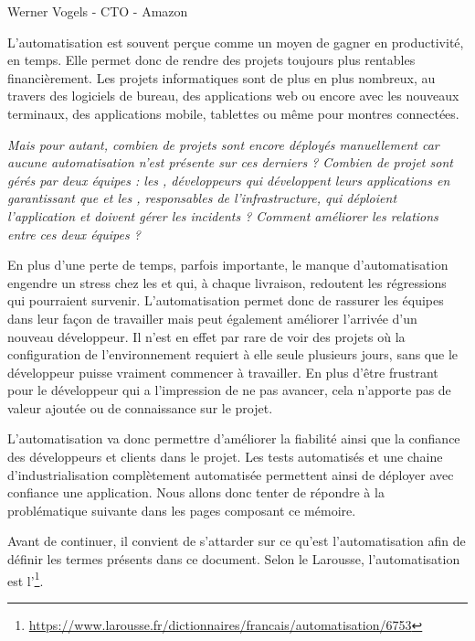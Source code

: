 \epigraph{}{Werner Vogels - \gls{CTO} - Amazon}

L'automatisation est souvent perçue comme un moyen de gagner en productivité, en temps. Elle permet donc de rendre des projets toujours plus rentables financièrement. Les projets informatiques sont de plus en plus nombreux, au travers des logiciels de bureau, des applications web ou encore avec les nouveaux terminaux, des applications mobile, tablettes ou même pour montres connectées.
	
\emph{Mais pour autant, combien de projets sont encore déployés manuellement car aucune automatisation n'est présente sur ces derniers ? Combien de projet sont gérés par deux équipes : les \frquote{\dev}, développeurs qui développent leurs applications en garantissant que  et les \frquote{\ops}, responsables de l'infrastructure, qui déploient l'application et doivent gérer les incidents ? Comment améliorer les relations entre ces deux équipes ?}
	
En plus d'une perte de temps, parfois importante, le manque d'automatisation engendre un stress chez les \dev{} et \ops{} qui, à chaque livraison, redoutent les régressions qui pourraient survenir. L'automatisation permet donc de rassurer les équipes dans leur façon de travailler mais peut également améliorer l'arrivée d'un nouveau développeur. Il n'est en effet par rare de voir des projets où la configuration de l'environnement requiert à elle seule plusieurs jours, sans que le développeur puisse vraiment commencer à travailler. En plus d'être frustrant pour le développeur qui a l'impression de ne pas avancer, cela n'apporte pas de valeur ajoutée ou de connaissance sur le projet.

L'automatisation va donc permettre d'améliorer la fiabilité ainsi que la confiance des développeurs et clients dans le projet. Les tests automatisés et une chaine d'industrialisation complètement automatisée permettent ainsi de déployer avec confiance une application. Nous allons donc tenter de répondre à la problématique suivante dans les pages composant ce mémoire.

\hrulefill

{\large \problematique}

\hrulefill

Avant de continuer, il convient de s'attarder sur ce qu'est l'automatisation afin de définir les termes présents dans ce document. Selon le Larousse, l'automatisation est l'\footnote{\url{https://www.larousse.fr/dictionnaires/francais/automatisation/6753}}. 

